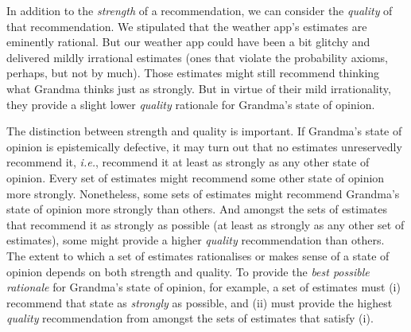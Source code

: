 In addition to the \textit{strength} of a recommendation, we can consider the \textit{quality} of that recommendation. We stipulated that the weather app's estimates are eminently rational. But our weather app could have been a bit glitchy and delivered mildly irrational estimates (ones that violate the probability axioms, perhaps, but not by much). Those estimates might still recommend thinking what Grandma thinks just as strongly. But in virtue of their mild irrationality, they provide a slight lower \textit{quality} rationale for Grandma's state of opinion.

The distinction between strength and quality is important. If Grandma's state of opinion is epistemically defective, it may turn out that no estimates unreservedly recommend it, \textit{i.e.}, recommend it at least as strongly as any other state of opinion. Every set of estimates might recommend some other state of opinion more strongly. Nonetheless, some sets of estimates might recommend Grandma's state of opinion more strongly than others. And amongst the sets of estimates that recommend it as strongly as possible (at least as strongly as any other set of estimates), some might provide a higher \textit{quality} recommendation than others. The extent to which a set of estimates rationalises or makes sense of a state of opinion depends on both strength and quality. To provide the \textit{best possible rationale} for Grandma's state of opinion, for example, a set of estimates must (i) recommend that state as \textit{strongly} as possible, and (ii) must provide the highest \textit{quality} recommendation from amongst the sets of estimates that satisfy (i).

